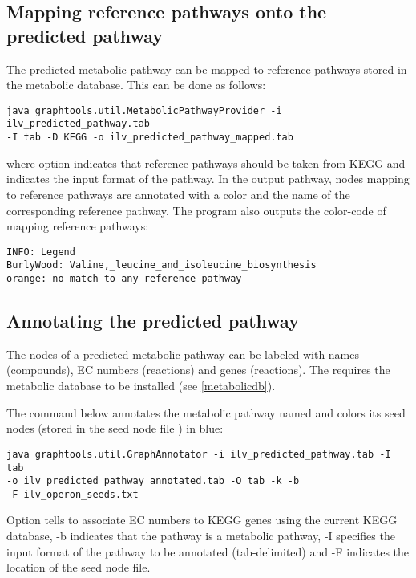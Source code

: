 \subsection{Mapping reference pathways onto the predicted pathway}

The predicted metabolic pathway can be mapped to reference pathways stored in
the metabolic database. This can be done as follows:

\begin{verbatim}
java graphtools.util.MetabolicPathwayProvider -i ilv_predicted_pathway.tab 
-I tab -D KEGG -o ilv_predicted_pathway_mapped.tab
\end{verbatim}

where option  indicates that reference pathways should be taken from
KEGG and  indicates the input format of the pathway. In the output
pathway, nodes mapping to reference pathways are annotated with
a color and the name of the corresponding reference pathway. 
The program  also outputs the color-code of mapping reference pathways:

\begin{lstlisting}
INFO: Legend
BurlyWood: Valine,_leucine_and_isoleucine_biosynthesis
orange: no match to any reference pathway
\end{lstlisting}

\subsection{Annotating the predicted pathway}

The nodes of a predicted metabolic pathway can be labeled with names
(compounds), EC numbers (reactions) and genes (reactions). 
The requires the metabolic database to be installed (see
\ref{metabolicdb}).

The command below annotates the metabolic pathway named
 and colors its seed
nodes (stored in the seed node file  ) in blue:

\begin{verbatim}
java graphtools.util.GraphAnnotator -i ilv_predicted_pathway.tab -I tab 
-o ilv_predicted_pathway_annotated.tab -O tab -k -b 
-F ilv_operon_seeds.txt
\end{verbatim}

Option  tells  to associate EC numbers to
KEGG genes using the current KEGG database, {-b} indicates that the pathway is a metabolic
pathway, {-I} specifies the input format of the pathway to be annotated
(tab-delimited) and {-F} indicates the location of the seed node file.

